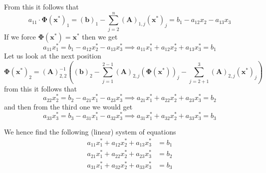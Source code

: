 \documentclass{article}
\newcommand\A{\mathbf{A}}
\begin{document}
From this it follows that
\begin{equation*}
     a_{11}\cdot \mathbf{\Phi}\left(\mathbf{x}^{*}\right)_{1} = \left(\mathbf{b}\right)_{1} - \sum_{j=2}^{n}\left(\A\right)_{1,j}\left(\mathbf{x}^{*}\right)_{j} = b_{1} - a_{12}x_{2} - a_{13}x_{3}
\end{equation*}
If we force $\mathbf{\Phi}\left(\mathbf{x}^{*}\right)  = \mathbf{x}^{*}$ then we get
\begin{equation}
     a_{11} x^{*}_{1} = b_{1} - a_{12}x^{*}_{2} - a_{13}x^{*}_{3} \implies a_{11} x^{*}_{1}+a_{12}x^{*}_{2} + a_{13}x^{*}_{3} = b_{1}
\end{equation}
Let us look at the next position
\begin{equation*}
   \mathbf{\Phi}\left(\mathbf{x}^{*}\right)_{2} = \left(\A\right)_{2,2}^{-1}\left(\left(\mathbf{b}\right)_{2} - \sum_{j=1}^{2-1}\left(\mathbf{A}\right)_{2,j}\left(\mathbf{\Phi}\left(\mathbf{x}^{*}\right)\right)_{j} - \sum_{j=2+1}^{3}\left(\A\right)_{2,j}\left(\mathbf{x}^{*}\right)_{j}\right) 
\end{equation*}
from this it follows that
\begin{equation}
    a_{22}x^{*}_{2} = b_{2} - a_{21}x^{*}_{1} - a_{23}x^{*}_{3} \implies a_{21}x^{*}_{1} +a_{22}x^{*}_{2} + a_{23}x^{*}_{3} = b_{2}
\end{equation}
and then from the third one we would get
\begin{equation}
    a_{33}x^{*}_{3} = b_{3} - a_{31}x^{*}_{1} - a_{32}x^{*}_{3} \implies a_{31}x^{*}_{1} +a_{32}x^{*}_{2} + a_{33}x^{*}_{3} = b_{3}
\end{equation}

\pagebreak

\noindent We hence find the following (linear) system of equations
\begin{align*}
    a_{11} x^{*}_{1}+a_{12}x^{*}_{2} + a_{13}x^{*}_{3} &= b_{1} \\
    a_{21}x^{*}_{1} +a_{22}x^{*}_{2} + a_{23}x^{*}_{3} &= b_{2} \\
    a_{31}x^{*}_{1} +a_{32}x^{*}_{2} + a_{33}x^{*}_{3} &= b_{3}
\end{align*}
\end{document}
